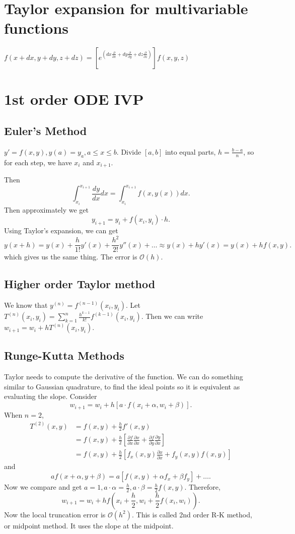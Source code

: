 \documentclass[class=article, crop=false]{standalone}
\theoremstyle{plain}
\theoremstyle{remark}
\begin{document}
\section{Taylor expansion for multivariable functions}

$f(x+dx,y+dy,z+dz) = [e^{(dx \frac{\partial}{\partial x} + dy \frac{\partial}{\partial y} + dz \frac{\partial}{\partial z})}] f(x,y,z) $ 
\section{1st order ODE IVP}
\subsection{Euler's Method}
$y'=f(x,y),y(a)=y_a, a \leq x \leq b$. 
Divide $[a,b]$ into equal parts,  $h=\frac{b-a}{n} $, so for each step, we have $x_i$ and $x_{i+1}$.

Then
\[
	\int_{x_i}^{x_{i+1}} \frac{dy}{dx}dx= \int_{x_i}^{x_{i+1}} f(x,y(x) )dx  
.\] 
Then approximately we get
\[
	y_{i+1}=y_i + f(x_i,y_i) \cdot h
.\] 
Using Taylor's expansion, we can get
\[
	y(x+h) =y(x) +\frac{h}{1!}y'(x) +\frac{h^2}{2!}y''(x) + \ldots \approx y(x) + h y'(x) = y(x)+h f(x,y)   
.\]
which gives us the same thing.
The error is $\mathcal{O}(h) $.

\subsection{Higher order Taylor method}
We know that $y^{(n)}=f^{(n-1)}(x_i,y_i) $. 
Let $T^{(n)}(x_i,y_i) = \sum_{k=1}^n  \frac{h^{k-1}}{k!} f^{(k-1)}(x_i,y_i)$. 
Then we can write $w_{i+1} = w_i + h T^{(n)}(x_i,y_i) $.

\subsection{Runge-Kutta Methods}
Taylor needs to compute the derivative of the function.
We can do something similar to Gaussian quadrature, to find the ideal points so it is equivalent as evaluating the slope.
Consider
\[
	w_{i+1}=w_i + h [a \cdot f(x_i+\alpha,w_i+\beta) ]
.\] 
When $ n =2$,
\begin{equation*}
\begin{split}
	T^{(2)}(x,y) &= f(x,y) +\frac{h}{2}f'(x,y)\\
		     &= f(x,y)  + \frac{h}{2} \left[  \frac{\partial f}{\partial x} \frac{\partial x}{\partial x} + \frac{\partial f}{\partial y} \frac{\partial y}{\partial x}  \right] \\
		     & = f(x,y) + \frac{h}{2} [f_x (x,y) \frac{\partial x}{\partial x} + f_y (x,y) f(x,y)    ]
\end{split}
\end{equation*}
and
\[
	a f(x+\alpha,y+\beta) = a [f(x,y) + \alpha f_x + \beta f_y] + \ldots
.\] 
Now we compare and get $a=1,a \cdot  \alpha = \frac{h}{2}, a \cdot \beta = \frac{h}{2}f(x,y)$. Therefore,
\[
	w_{i+1} = w_i + h f(x_i+\frac{h}{2},w_i + \frac{h}{2}f(x_i,w_i) ) 
.\] 
Now the local truncation error is $\mathcal{O}(h^2) $.
This is called 2nd order R-K method, or midpoint method. It uses the slope at the midpoint.
\end{document}
